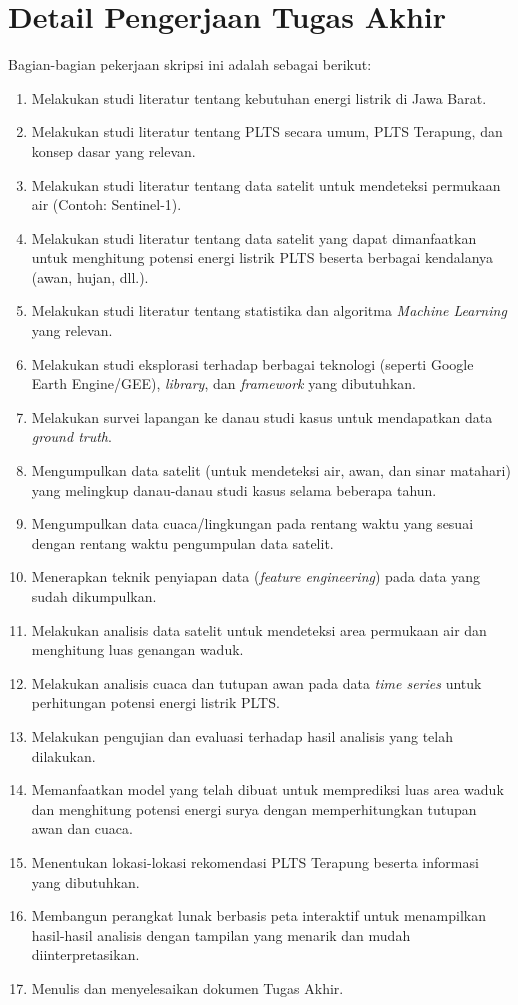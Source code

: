 \documentclass[a4paper,twoside]{article}
\begin{document}
\section{Detail Pengerjaan Tugas Akhir}
Bagian-bagian pekerjaan skripsi ini adalah sebagai berikut:
\begin{enumerate}
	\item Melakukan studi literatur tentang kebutuhan energi listrik di Jawa Barat.
	\item Melakukan studi literatur tentang PLTS secara umum, PLTS
	      Terapung, dan konsep dasar yang relevan.
	\item Melakukan studi literatur tentang data satelit untuk mendeteksi permukaan air
	      (Contoh: Sentinel-1).
	\item Melakukan studi literatur tentang data satelit yang dapat
	      dimanfaatkan untuk menghitung potensi energi listrik PLTS beserta
	      berbagai kendalanya (awan, hujan, dll.).
	\item Melakukan studi literatur tentang statistika dan algoritma
	      \textit{Machine Learning} yang relevan.
	\item Melakukan studi eksplorasi terhadap berbagai teknologi (seperti
	      Google Earth Engine/GEE), \textit{library}, dan \textit{framework}
	      yang dibutuhkan.
	\item Melakukan survei lapangan ke danau studi kasus untuk mendapatkan
	      data \textit{ground truth}.
	\item Mengumpulkan data satelit (untuk mendeteksi air, awan, dan sinar
	      matahari) yang melingkup danau-danau studi kasus selama beberapa
	      tahun.
	\item Mengumpulkan data cuaca/lingkungan pada rentang waktu yang sesuai
	      dengan rentang waktu pengumpulan data satelit.
	\item Menerapkan teknik penyiapan data (\textit{feature engineering})
	      pada data yang sudah dikumpulkan.
	\item Melakukan analisis data satelit untuk mendeteksi area permukaan
	      air dan menghitung luas genangan waduk.
	\item Melakukan analisis cuaca dan tutupan awan pada data \textit{time series}
	      untuk perhitungan potensi energi listrik PLTS.
	\item Melakukan pengujian dan evaluasi terhadap hasil analisis yang telah
	      dilakukan.
	\item Memanfaatkan model yang telah dibuat untuk memprediksi luas area
	      waduk dan menghitung potensi energi surya dengan memperhitungkan
	      tutupan awan dan cuaca.
	\item Menentukan lokasi-lokasi rekomendasi PLTS Terapung beserta
	      informasi yang dibutuhkan.
	\item Membangun perangkat lunak berbasis peta interaktif untuk
	      menampilkan hasil-hasil analisis dengan tampilan yang menarik dan
	      mudah diinterpretasikan.
	\item Menulis dan menyelesaikan dokumen Tugas Akhir.
\end{enumerate}
\end{document}
